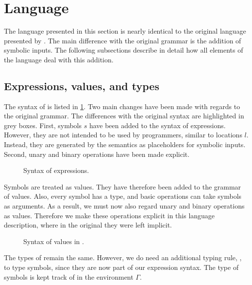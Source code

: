 
\section{Language}
\label{sec:language}

The language presented in this section is nearly identical to the original \TOPHAT language presented by \citet{Steenvoorden2019}.
The main difference with the original grammar is the addition of symbolic inputs.
The following subsections describe in detail how all elements of the \TOPHAT language deal with this addition.



\subsection{Expressions, values, and types}
\label{expressions}

The syntax of \TOPHAT is listed in \cref{fig:syntaxtophat}.
Two main changes have been made with regards to the original \TOPHAT grammar.
The differences with the original syntax are highlighted in grey boxes.
First, symbols $s$ have been added to the syntax of expressions.
However, they are not intended to be used by programmers, similar to locations $l$.
Instead, they are generated by the semantics as placeholders for symbolic inputs.
Second, unary and binary operations have been made explicit.

\begin{figure}[h]
  \small
  \caption{Syntax of \TOPHAT expressions.}
  \label{fig:syntaxtophat}
\end{figure}

Symbols are treated as values.
They have therefore been added to the grammar of values.
Also, every symbol has a type, and basic operations can take symbols as arguments.
As a result, we must now also regard unary and binary operations as values.
Therefore we make these operations explicit in this language description,
where in the original they were left implicit.

\begin{figure}[h]
  \small
  \caption{Syntax of values in \TOPHAT.}
  \label{fig:syntaxvalues}
\end{figure}

The types of \TOPHAT remain the same.
However, we do need an additional typing rule, , to type symbols,
since they are now part of our expression syntax.
The type of symbols is kept track of in the environment $\Gamma$.

